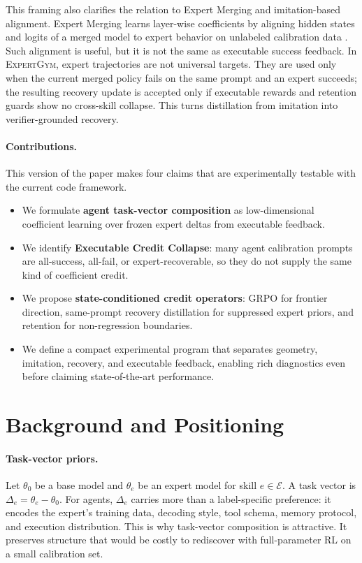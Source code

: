 \documentclass[11pt]{article}
\newcommand{\method}{\textsc{ExpertGym}\xspace}
\newcommand{\grpo}{\textsc{GRPO}\xspace}
\begin{document}
This framing also clarifies the relation to Expert Merging and imitation-based alignment.  Expert Merging learns layer-wise coefficients by aligning hidden states and logits of a merged model to expert behavior on unlabeled calibration data \citep{zhang2025expertmerging}.  Such alignment is useful, but it is not the same as executable success feedback.  In \method, expert trajectories are not universal targets.  They are used only when the current merged policy fails on the same prompt and an expert succeeds; the resulting recovery update is accepted only if executable rewards and retention guards show no cross-skill collapse.  This turns distillation from imitation into verifier-grounded recovery.

\paragraph{Contributions.}  This version of the paper makes four claims that are experimentally testable with the current code framework.
\begin{itemize}[leftmargin=*]
    \item We formulate \textbf{agent task-vector composition} as low-dimensional coefficient learning over frozen expert deltas from executable feedback.
    \item We identify \textbf{Executable Credit Collapse}: many agent calibration prompts are all-success, all-fail, or expert-recoverable, so they do not supply the same kind of coefficient credit.
    \item We propose \textbf{state-conditioned credit operators}: \grpo for frontier direction, same-prompt recovery distillation for suppressed expert priors, and retention for non-regression boundaries.
    \item We define a compact experimental program that separates geometry, imitation, recovery, and executable feedback, enabling rich diagnostics even before claiming state-of-the-art performance.
\end{itemize}

\section{Background and Positioning}

\paragraph{Task-vector priors.}  Let $\theta_0$ be a base model and $\theta_e$ be an expert model for skill $e\in\mathcal{E}$.  A task vector is $\Delta_e=\theta_e-\theta_0$.  For agents, $\Delta_e$ carries more than a label-specific preference: it encodes the expert's training data, decoding style, tool schema, memory protocol, and execution distribution.  This is why task-vector composition is attractive.  It preserves structure that would be costly to rediscover with full-parameter RL on a small calibration set.
\end{document}
